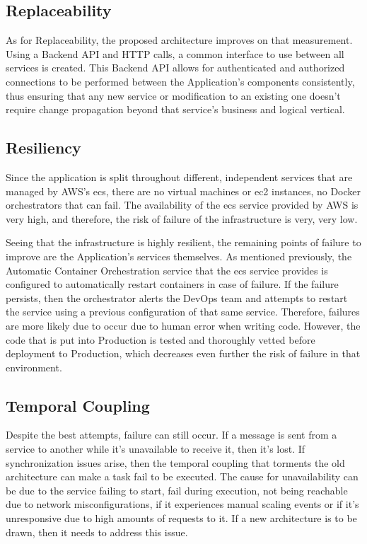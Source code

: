 \subsection{Replaceability}\label{methodology:sss:replaceability-fix}

As for Replaceability, the proposed architecture improves on that measurement. Using a Backend API and HTTP calls, a common interface to use between all services is created. This Backend API allows for authenticated and authorized connections to be performed between the Application's components consistently, thus ensuring that any new service or modification to an existing one doesn't require change propagation beyond that service's business and logical vertical. 

\subsection{Resiliency}\label{methodology:sss:resiliency-fix}

Since the application is split throughout different, independent services that are managed by AWS's \gls{ecs}, there are no virtual machines or \gls{ec2} instances, no Docker orchestrators that can fail.
The availability of the \gls{ecs} service provided by AWS is very high, and therefore, the risk of failure of the infrastructure is very, very low. 

Seeing that the infrastructure is highly resilient, the remaining points of failure to improve are the Application's services themselves. As mentioned previously, the Automatic Container Orchestration service that the \gls{ecs} service provides is configured to automatically restart containers in case of failure. If the failure persists, then the orchestrator alerts the DevOps team and attempts to restart the service using a previous configuration of that same service. Therefore, failures are more likely due to occur due to human error when writing code. However, the code that is put into Production is tested and thoroughly vetted before deployment to Production, which decreases even further the risk of failure in that environment.



\subsection{Temporal Coupling}\label{methodology:sss:temporal-coupling}

Despite the best attempts, failure can still occur. If a message is sent from a service to another while it's unavailable to receive it, then it's lost. If synchronization issues arise, then the temporal coupling that torments the old architecture can make a task fail to be executed. The cause for unavailability can be due to the service failing to start, fail during execution, not being reachable due to network misconfigurations, if it experiences manual scaling events or if it's unresponsive due to high amounts of requests to it. If a new architecture is to be drawn, then it needs to address this issue.

